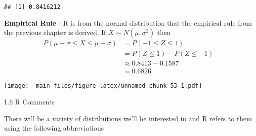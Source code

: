 \documentclass[]{book}
\begin{document}
\begin{verbatim}
## [1] 0.8416212
\end{verbatim}

\textbf{Empirical Rule} - It is from the normal distribution that the
empirical rule from the previous chapter is derived. If
\(X\sim N(\mu,\sigma^{2})\) then
\[\begin{aligned} P(\mu-\sigma\le X\le\mu+\sigma)   
  &=    P(-1 \le Z \le 1) \\
    &=  P(Z \le 1) - P(Z \le -1) \\
    &\approx    0.8413-0.1587 \\
    &=  0.6826 \end{aligned}\]

\texttt{[image: \_main\_files/figure-latex/unnamed-chunk-53-1.pdf]}

1.6 R Comments

There will be a variety of distributions we'll be interested in and R
refers to them using the following abbreviations
\end{document}

